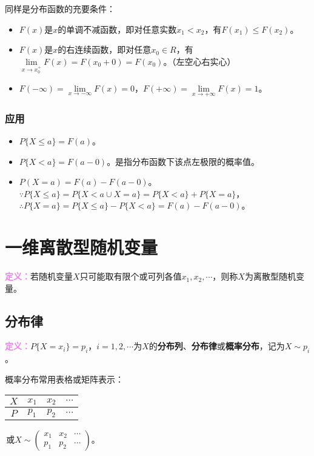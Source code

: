同样是分布函数的充要条件：

\begin{itemize}
    \item $F(x)$是$x$的单调不减函数，即对任意实数$x_1<x_2$，有$F(x_1)\leqslant F(x_2)$。
    \item $F(x)$是$x$的右连续函数，即对任意$x_0\in R$，有$\lim\limits_{x\to x_0^+}F(x)=F(x_0+0)=F(x_0)$。（左空心右实心）
    \item $F(-\infty)=\lim\limits_{x\to-\infty}F(x)=0$，$F(+\infty)=\lim\limits_{x\to+\infty}F(x)=1$。
\end{itemize}

\subsubsection{应用}

\begin{itemize}
    \item $P\{X\leqslant a\}=F(a)$。
    \item $P\{X<a\}=F(a-0)$。是指分布函数下该点左极限的概率值。
    \item $P(X=a)=F(a)-F(a-0)$。$\because P\{X\leqslant a\}=P\{X<a\cup X=a\}=P\{X<a\}+P\{X=a\}$，$\therefore P\{X=a\}=P\{X\leqslant a\}-P\{X<a\}=F(a)-F(a-0)$。
\end{itemize}

\section{一维离散型随机变量}

\textcolor{violet}{\textbf{定义：}}若随机变量$X$只可能取有限个或可列各值$x_1,x_2,\cdots$，则称$X$为离散型随机变量。

\subsection{分布律}

\textcolor{violet}{\textbf{定义：}}$P\{X=x_i\}=p_i$，$i=1,2,\cdots$为$X$的\textbf{分布列}、\textbf{分布律}或\textbf{概率分布}，记为$X\sim p_i$。

概率分布常用表格或矩阵表示：\medskip

\begin{tabular}{c|ccc}
    \hline
    $X$ & $x_1$ & $x_2$ & $\cdots$ \\ \hline
    $P$ & $p_1$ & $p_2$ & $\cdots$ \\
    \hline
\end{tabular}\,或$X\sim\left(\begin{array}{ccc}
    x_1 & x_2 & \cdots \\
    p_1 & p_2 & \cdots
\end{array}\right)$。\medskip

